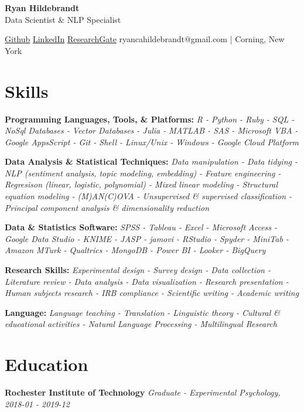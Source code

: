 \documentclass[a4paper,9pt]{extarticle}
\begin{document}
\begin{center}
\textbf{\Large Ryan Hildebrandt}\\[2pt]
Data Scientist \& NLP Specialist

\href{https://github.com/ryancahildebrandt}{Github} \href{https://linkedin.com/in/rcah}{LinkedIn} \href{https://researchgate.net/profile/Ryan-Hildebrandt}{ResearchGate}
ryancahildebrandt@gmail.com | Corning, New York
	\end{center}

\section*{Skills}

\noindent
\textbf{Programming Languages, Tools, \& Platforms:}
\textit{R - Python - Ruby - SQL - NoSql Databases - Vector Databases - Julia - MATLAB - SAS - Microsoft VBA - Google AppsScript - Git - Shell - Linux/Unix - Windows - Google Cloud Platform}

\noindent
\textbf{Data Analysis \& Statistical Techniques:}
\textit{Data manipulation - Data tidying - NLP (sentiment analysis, topic modeling, embedding) - Feature engineering - Regresison (linear, logistic, polynomial) - Mixed linear modeling - Structural equation modeling - (M)AN(C)OVA - Unsupervised \& supervised classification - Principal component analysis \& dimensionality reduction}

\noindent
\textbf{Data \& Statistics Software:}
\textit{SPSS - Tableau - Excel - Microsoft Access - Google Data Studio - KNIME - JASP - jamovi - RStudio - Spyder - MiniTab - Amazon MTurk - Qualtrics - MongoDB - Power BI - Looker - BigQuery}

\noindent
\textbf{Research Skills:}
\textit{Experimental design - Survey design - Data collection - Literature review - Data analysis - Data visualization - Research presentation - Human subjects research - IRB compliance - Scientific writing - Academic writing}

\noindent
\textbf{Language:}
\textit{Language teaching - Translation - Linguistic theory - Cultural \& educational activities - Natural Language Processing - Multilingual Research}

\section*{Education}

\noindent
\textbf{Rochester Institute of Technology}
\textit{Graduate - Experimental Psychology, 2018-01 - 2019-12}
\end{document}
